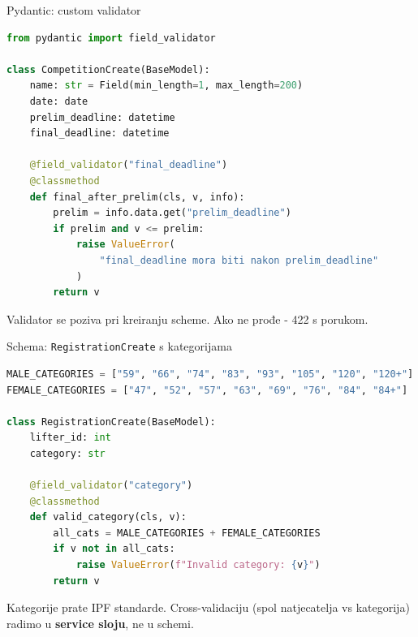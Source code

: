 \begin{frame}[fragile,shrink=5]{Pydantic: custom validator}
\begin{lstlisting}[language=python]
from pydantic import field_validator

class CompetitionCreate(BaseModel):
    name: str = Field(min_length=1, max_length=200)
    date: date
    prelim_deadline: datetime
    final_deadline: datetime

    @field_validator("final_deadline")
    @classmethod
    def final_after_prelim(cls, v, info):
        prelim = info.data.get("prelim_deadline")
        if prelim and v <= prelim:
            raise ValueError(
                "final_deadline mora biti nakon prelim_deadline"
            )
        return v
\end{lstlisting}

\vspace{0.4em}
Validator se poziva pri kreiranju scheme. Ako ne prođe - 422 s porukom.
\end{frame}

\begin{frame}[fragile,shrink=5]{Schema: \texttt{RegistrationCreate} s kategorijama}
\begin{lstlisting}[language=python]
MALE_CATEGORIES = ["59", "66", "74", "83", "93", "105", "120", "120+"]
FEMALE_CATEGORIES = ["47", "52", "57", "63", "69", "76", "84", "84+"]

class RegistrationCreate(BaseModel):
    lifter_id: int
    category: str

    @field_validator("category")
    @classmethod
    def valid_category(cls, v):
        all_cats = MALE_CATEGORIES + FEMALE_CATEGORIES
        if v not in all_cats:
            raise ValueError(f"Invalid category: {v}")
        return v
\end{lstlisting}

\vspace{0.4em}
Kategorije prate IPF standarde. Cross-validaciju (spol natjecatelja vs kategorija) radimo u \textbf{service sloju}, ne u schemi.
\end{frame}

